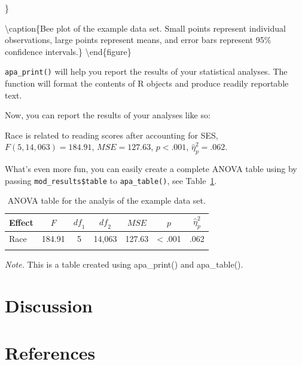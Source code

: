 \documentclass[
  english,
  man]{apa6}
\begin{document}
\}

\textbackslash caption\{Bee plot of the example data set. Small points represent individual observations, large points represent means, and error bars represent 95\% confidence intervals.\}\label{fig:beeplot}
\textbackslash end\{figure\}

\texttt{apa\_print()} will help you report the results of your statistical analyses.
The function will format the contents of R objects and produce readily reportable text.

Now, you can report the results of your analyses like so:

Race is related to reading scores after accounting for SES,
\(F(5, 14,063) = 184.91\), \(\mathit{MSE} = 127.63\), \(p < .001\), \(\hat{\eta}^2_p = .062\).

What's even more fun, you can easily create a complete ANOVA table using by passing \texttt{mod\_results\$table} to \texttt{apa\_table()}, see Table~\ref{tab:anova-table}.

\begin{table}[tbp]

\begin{center}
\begin{threeparttable}

\caption{\label{tab:anova-table}ANOVA table for the analyis of the example data set.}

\begin{tabular}{lrcrrrl}
\toprule
Effect & \multicolumn{1}{c}{$F$} & \multicolumn{1}{c}{$\mathit{df}_1$} & \multicolumn{1}{c}{$\mathit{df}_2$} & \multicolumn{1}{c}{$\mathit{MSE}$} & \multicolumn{1}{c}{$p$} & \multicolumn{1}{c}{$\hat{\eta}^2_p$}\\
\midrule
Race & 184.91 & 5 & 14,063 & 127.63 & < .001 & .062\\
\bottomrule
\addlinespace
\end{tabular}

\begin{tablenotes}[para]
\normalsize{\textit{Note.} This is a table created using apa\_print() and apa\_table().}
\end{tablenotes}

\end{threeparttable}
\end{center}

\end{table}

\hypertarget{discussion}{%
\section{Discussion}\label{discussion}}

\newpage

\hypertarget{references}{%
\section{References}\label{references}}

\begingroup
\setlength{\parindent}{-0.5in}
\setlength{\leftskip}{0.5in}

\hypertarget{refs}{}

\endgroup
\end{document}
